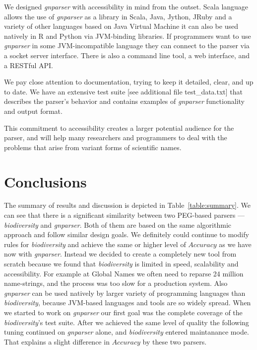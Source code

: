 \documentclass{bmcart}
\begin{document}
We designed \textit{gnparser} with accessibility in mind from the outset. Scala language allows the use of \textit{gnparser} as a library in Scala, Java, Jython, JRuby and a variety of other languages based on Java Virtual Machine it can also be used natively in R and Python via JVM-binding libraries. If programmers want to use \textit{gnparser} in some JVM-incompatible language they can connect to the parser via a socket server interface. There is also a command line tool, a web interface, and a RESTful API.

We pay close attention to documentation, trying to keep it detailed, clear, and up to date. We have an extensive test suite [see additional file test\_data.txt] that describes the parser's behavior and contains examples of \textit{gnparser} functionality and output format.

This commitment to accessibility creates a larger potential audience for the parser, and will help many researchers and programmers to deal with the problems that arise from variant forms of scientific names.

\section*{Conclusions}

The summary of results and discussion is depicted in Table~\ref{table:summary}. We can see that there is a significant similarity between two PEG-based parsers --- \textit{biodiversity} and \textit{gnparser}. Both of them are based on the same algorithmic approach and follow similar design goals. We definitely could continue to modify rules for \textit{biodiversity} and achieve the same or higher level of $Accuracy$ as we have now with \textit{gnparser}. Instead we decided to create a completely new tool from scratch because we found that \textit{biodiversity} is limited in speed, scalability and accessibility. For example at Global Names we often need to reparse 24 million name-strings, and the process was too slow for a production system. Also \textit{gnparser} can be used natively by larger variety of programming languages than \textit{biodiversity}, because JVM-based languages and tools are so widely spread. When we started to work on \textit{gnparser} our first goal was the complete coverage of the \textit{biodiversity}'s test suite. After we achieved the same level of quality the following tuning continued on \textit{gnparser} alone, and \textit{biodiversity} entered maintanance mode. That explains a slight difference in $Accuracy$ by these two parsers.
\end{document}
